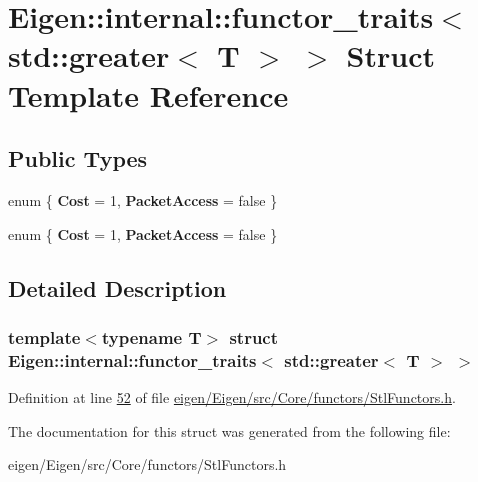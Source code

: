 \hypertarget{struct_eigen_1_1internal_1_1functor__traits_3_01std_1_1greater_3_01_t_01_4_01_4}{}\section{Eigen\+:\+:internal\+:\+:functor\+\_\+traits$<$ std\+:\+:greater$<$ T $>$ $>$ Struct Template Reference}
\label{struct_eigen_1_1internal_1_1functor__traits_3_01std_1_1greater_3_01_t_01_4_01_4}
\subsection*{Public Types}
\begin{DoxyCompactItemize}
\item 
\mbox{\label{struct_eigen_1_1internal_1_1functor__traits_3_01std_1_1greater_3_01_t_01_4_01_4_afb4758cfe440ee63c8e85d1748939ed6}} 
enum \{ {\bfseries Cost} = 1, 
{\bfseries Packet\+Access} = false
 \}
\item 
\mbox{\label{struct_eigen_1_1internal_1_1functor__traits_3_01std_1_1greater_3_01_t_01_4_01_4_a677ce1fa3e7780959e8a14b466c41d6b}} 
enum \{ {\bfseries Cost} = 1, 
{\bfseries Packet\+Access} = false
 \}
\end{DoxyCompactItemize}


\subsection{Detailed Description}
\subsubsection*{template$<$typename T$>$\newline
struct Eigen\+::internal\+::functor\+\_\+traits$<$ std\+::greater$<$ T $>$ $>$}



Definition at line \hyperlink{eigen_2_eigen_2src_2_core_2functors_2_stl_functors_8h_source_l00052}{52} of file \hyperlink{eigen_2_eigen_2src_2_core_2functors_2_stl_functors_8h_source}{eigen/\+Eigen/src/\+Core/functors/\+Stl\+Functors.\+h}.



The documentation for this struct was generated from the following file\+:\begin{DoxyCompactItemize}
\item 
eigen/\+Eigen/src/\+Core/functors/\+Stl\+Functors.\+h\end{DoxyCompactItemize}
